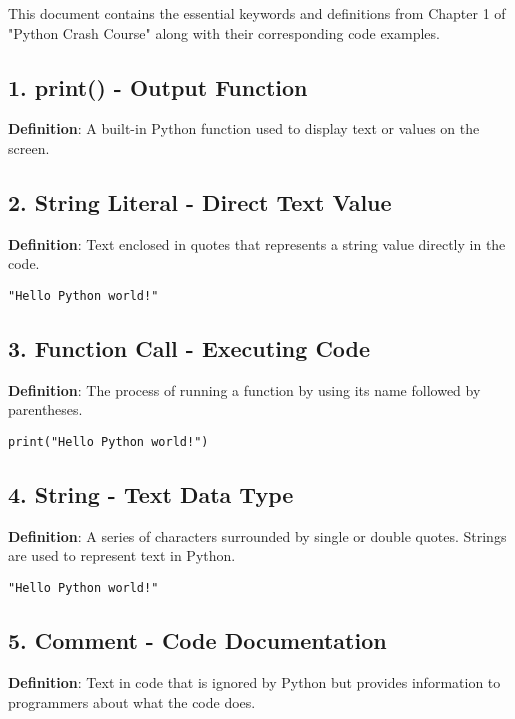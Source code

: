 
This document contains the essential keywords and definitions from Chapter 1 of "Python Crash Course" along with their corresponding code examples.

\subsection*{1. print() - Output Function}
\textbf{Definition}: A built-in Python function used to display text or values on the screen.



\subsection*{2. String Literal - Direct Text Value}
\textbf{Definition}: Text enclosed in quotes that represents a string value directly in the code.

\begin{lstlisting}
"Hello Python world!"
\end{lstlisting}

\subsection*{3. Function Call - Executing Code}
\textbf{Definition}: The process of running a function by using its name followed by parentheses.

\begin{lstlisting}
print("Hello Python world!")
\end{lstlisting}

\subsection*{4. String - Text Data Type}
\textbf{Definition}: A series of characters surrounded by single or double quotes. Strings are used to represent text in Python.

\begin{lstlisting}
"Hello Python world!"
\end{lstlisting}

\subsection*{5. Comment - Code Documentation}
\textbf{Definition}: Text in code that is ignored by Python but provides information to programmers about what the code does.

